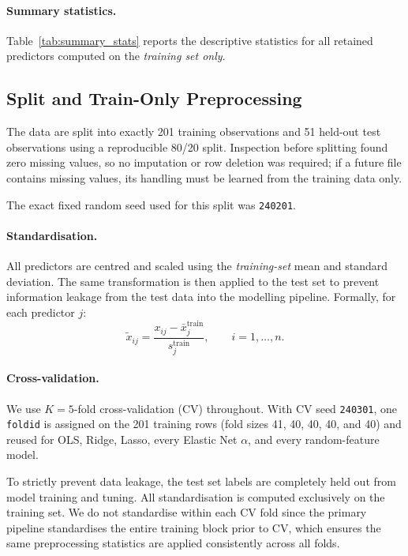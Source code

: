 \paragraph{Summary statistics.}
Table~\ref{tab:summary_stats} reports the descriptive statistics for all
retained predictors computed on the \emph{training set only}.



\subsection{Split and Train-Only Preprocessing}
\label{sec:split-preprocess}

The data are split into exactly 201 training observations and 51 held-out test
observations using a reproducible 80/20 split.  Inspection before splitting
found zero missing values, so no imputation or row deletion was required; if a
future file contains missing values, its handling must be learned from the
training data only.

The exact fixed random seed used for this split was \texttt{240201}.

\paragraph{Standardisation.}
All predictors are centred and scaled using the \emph{training-set} mean and
standard deviation.  The same transformation is then applied to the test set to
prevent information leakage from the test data into the modelling pipeline.
Formally, for each predictor $j$:
\[
    \tilde{x}_{ij}
    = \frac{x_{ij} - \bar{x}_j^{\mathrm{train}}}
           {s_j^{\mathrm{train}}},
    \qquad i = 1, \dots, n.
\]

\paragraph{Cross-validation.}
We use $K = 5$-fold cross-validation (CV) throughout.  With CV seed
\texttt{240301}, one \texttt{foldid} is assigned on the 201 training rows (fold
sizes 41, 40, 40, 40, and 40) and reused for OLS, Ridge, Lasso, every Elastic
Net $\alpha$, and every random-feature model.

To strictly prevent data leakage, the test set labels are completely held out from model training and tuning. All standardisation is computed exclusively on the training set. We do not standardise within each CV fold since the primary pipeline standardises the entire training block prior to CV, which ensures the same preprocessing statistics are applied consistently across all folds.

